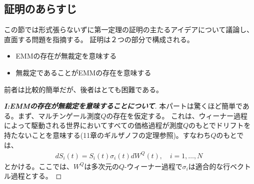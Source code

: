 \documentclass{jsbook}
\theoremstyle{withoutdotendstyle}
\numberwithin{theorem}{chapter}%
\begin{document}
\subsection{証明のあらすじ}
この節では形式張らないずに第一定理の証明の主たるアイデアについて議論し、直面する問題を指摘する。
証明は２つの部分で構成される。
\begin{itemize}
  \item EMMの存在が無裁定を意味する
  \item 無裁定であることがEMMの存在を意味する
\end{itemize}
前者は比較的簡単だが、後者はとても困難である。
\begin{proof}[{\bf I:EMMの存在が無裁定を意味することについて}]
  本パートは驚くほど簡単である。まず、マルチンゲール測度$Q$の存在を仮定する。
  これは、ウィーナー過程によって駆動される世界においてすべての価格過程が測度$Q$のもとでドリフトを持たないことを意味する(11章のギルザノフの定理参照)。すなわち$Q$のもとでは、
  \begin{align}
    dS_{i}\left(t\right) = S_{i}\left(t\right)\sigma_{i}\left(t\right)dW^{Q}\left(t\right), \quad i = 1, \dots , N
  \end{align}
  とかける。ここでは、$W^{Q}$は多次元の$Q$-ウィーナー過程で$\sigma_{i}$は適合的な行ベクトル過程とする。


\end{proof}
\end{document}
